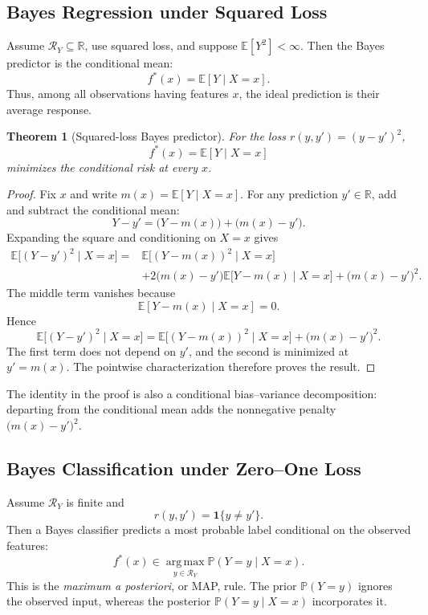 \documentclass[12pt,oneside]{book}
\numberwithin{equation}{section}
\theoremstyle{definition}
\theoremstyle{plain}
\newtheorem{theorem}{Theorem}[section]
\theoremstyle{remark}
\newcommand{\R}{\mathbb{R}}
\newcommand{\E}{\mathbb{E}}
\newcommand{\argmax}{\operatorname*{arg\,max}}
\begin{document}
\subsection{Bayes Regression under Squared Loss}
Assume $\mathcal{R}_Y\subseteq\R$, use squared loss, and suppose
$\E[Y^2]<\infty$. Then the Bayes predictor is the conditional mean:
\[
f^*(x)=\E[Y\mid X=x].
\]
Thus, among all observations having features $x$, the ideal prediction is their
average response.

\begin{theorem}[Squared-loss Bayes predictor]
For the loss $r(y,y')=(y-y')^2$,
\[
f^*(x)=\E[Y\mid X=x]
\]
minimizes the conditional risk at every $x$.
\end{theorem}

\begin{proof}
Fix $x$ and write $m(x)=\E[Y\mid X=x]$. For any prediction $y'\in\R$,
add and subtract the conditional mean:
\[
Y-y'=\bigl(Y-m(x)\bigr)+\bigl(m(x)-y'\bigr).
\]
Expanding the square and conditioning on $X=x$ gives
\begin{align*}
\E\bigl[(Y-y')^2\mid X=x\bigr]
={}&\E\bigl[(Y-m(x))^2\mid X=x\bigr]\\
&+2\bigl(m(x)-y'\bigr)
  \E\bigl[Y-m(x)\mid X=x\bigr]
  +\bigl(m(x)-y'\bigr)^2.
\end{align*}
The middle term vanishes because
\[
\E[Y-m(x)\mid X=x]=0.
\]
Hence
\[
\E\bigl[(Y-y')^2\mid X=x\bigr]
=\E\bigl[(Y-m(x))^2\mid X=x\bigr]
 +\bigl(m(x)-y'\bigr)^2.
\]
The first term does not depend on $y'$, and the second is minimized at
$y'=m(x)$. The pointwise characterization therefore proves the result.
\end{proof}

The identity in the proof is also a conditional bias--variance decomposition:
departing from the conditional mean adds the nonnegative penalty
$\bigl(m(x)-y'\bigr)^2$.

\subsection{Bayes Classification under Zero--One Loss}
Assume $\mathcal{R}_Y$ is finite and
\[
r(y,y')=\mathbf{1}\{y\neq y'\}.
\]
Then a Bayes classifier predicts a most probable label conditional on the
observed features:
\[
f^*(x)\in\argmax_{y\in\mathcal{R}_Y}
\mathbb{P}(Y=y\mid X=x).
\]
This is the \emph{maximum a posteriori}, or MAP, rule. The prior
$\mathbb{P}(Y=y)$ ignores the observed input, whereas the posterior
$\mathbb{P}(Y=y\mid X=x)$ incorporates it.
\end{document}
